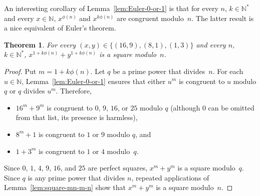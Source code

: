 \documentclass[12pt]{article}
\newcommand{\bZ}{\mathbb{Z}}
\newcommand{\bN}{\mathbb{N}} %
\newcommand{\bNast}{\bN^*}
\newtheorem{theorem}{Theorem}
\theoremstyle{definition}
\begin{document}
An interesting corollary of Lemma~\ref{lem:Euler-0-or-1} is that 
for every $n$, $k \in \bNast$ and every $x \in \bN$,
$x^{\phi(n)}$ and $x^{k \phi(n)}$ are congruent modulo~$n$.
The latter result is a nice equivalent of Euler's theorem.



   \begin{theorem}
    For every $(x, y) \in \{ (16, 9), (8, 1), (1, 3) \}$ and every $n$, $k \in \bNast$, 
    $x^{1 + k \phi(n)} + y^{1 + k \phi(n)}$ is a square modulo~$n$. 
  \end{theorem}

  \begin{proof}
    Put $m = 1 + k \phi(n)$.
    Let $q$ be a prime power that divides~$n$.
    For each $u \in \bN$, 
    Lemma~\ref{lem:Euler-0-or-1} ensures that either $u^m$ is congruent to $u$ modulo $q$ or $q$ divides $u^m$.
    Therefore, 
    \begin{itemize}
    \item $16^m + 9^m$ is congruent to $0$, $9$, $16$, or $25$ modulo $q$
      (although $0$ can be omitted from that list, its presence is harmless),
      \item $8^m + 1$ is congruent to $1$ or $9$ modulo $q$, and 
      \item $1 + 3^m$ is congruent to $1$ or $4$ modulo~$q$.
      \end{itemize}
      Since $0$, $1$, $4$, $9$, $16$, and $25$ are perfect squares,
      $x^m + y^m$ is a square modulo~$q$.
      Since $q$ is any prime power that divides $n$,
      repeated applications of Lemma~\ref{lem:square-mn-m-n}
      show that $x^m + y^m$ is a square modulo~$n$.
    \end{proof}




\end{document}
